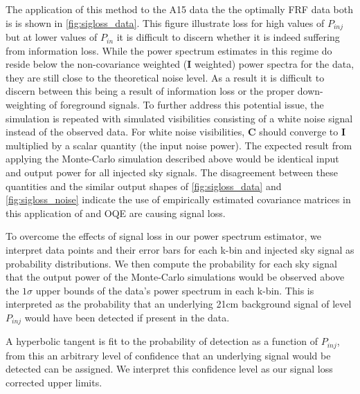 \documentclass[preprint2,hidelinks]{emulateapj}
\newcommand{\PAPER}{\mathrm{PAPER}}
\begin{document}
{  The application of this method to the A15 data the the optimally FRF data both is is shown in \autoref{fig:sigloss_data}. This figure illustrate loss for high values of $P_{inj}$ but at lower values of $P_{in}$ it is difficult to discern whether it is indeed suffering from information loss. While the power spectrum estimates in this regime do reside below the non-covariance weighted ($\mathbf{I}$ weighted) power spectra for the data, they are still close to the theoretical noise level. As a result it is difficult to discern between this being a result of information loss or the proper down-weighting of foreground signals.
  To further address this potential issue, the simulation is repeated with simulated visibilities consisting of a white noise signal instead of the observed data. For white noise visibilities, $\mathbf{C}$ should converge to $\mathbf{I}$ multiplied by a scalar quantity (the input noise power). The expected result from applying the Monte-Carlo simulation described above would be identical input and output power for all injected sky signals. The disagreement between these quantities and the similar output shapes of \autoref{fig:sigloss_data} and \autoref{fig:sigloss_noise} indicate the use of empirically estimated covariance matrices in this application of and OQE are causing signal loss. 

	To overcome the effects of signal loss in our power spectrum estimator, we interpret data points and their error bars for each k-bin and injected sky signal as probability distributions. We then compute the probability for each sky signal that the output power of the Monte-Carlo simulations would be observed above the $1\sigma$ upper bounds of the data's power spectrum in each k-bin. This is interpreted as the probability that an underlying 21cm background signal of level $P_{inj}$ would have been detected if present in the data.
	
	A hyperbolic tangent is fit to the probability of detection as a function of $P_{inj}$, from this an arbitrary level of confidence that an underlying signal would be detected can be assigned. We interpret this confidence level as our signal loss corrected upper limits.
 
 
}
\end{document}
